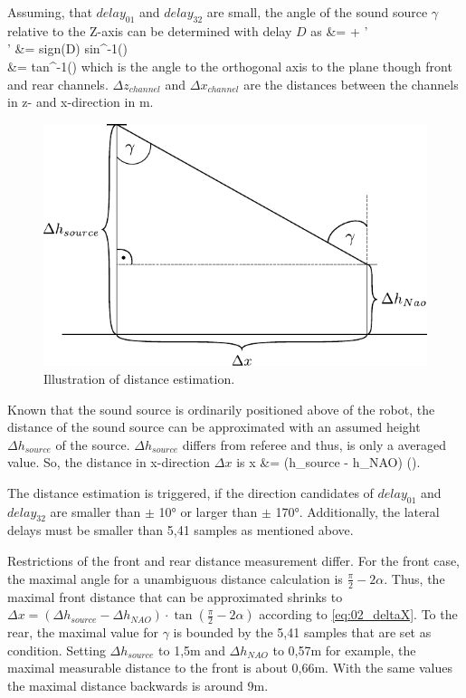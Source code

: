 Assuming, that $delay_{01}$ and $delay_{32}$ are small,
the angle of the sound source $\gamma$ relative
to the Z-axis can be determined with delay $D$ as
\bsub \bal
\gamma &= \alpha + \gamma'\\
\gamma' &= sign(D) \cdot sin^{-1}\left(\right)\\
\alpha &= tan^{-1}\left(\right)
\eal \esub
which is the angle to the orthogonal axis to the plane though
front and rear channels.
$\Delta z_{channel}$ and $\Delta x_{channel}$ are the distances between the channels
in z- and x-direction in \si{\meter}.
\begin{figure}[ht]
	\centering
		\includegraphics[width=0.6\columnwidth]{figures/x_distance}
	\caption{Illustration of distance estimation.}
    \label{fig:02_xDistance}
\end{figure}

Known that the sound source is ordinarily positioned above of the robot, the distance
of the sound source can be approximated with an assumed height $\Delta h_{source}$
of the source. $\Delta h_{source}$ differs from referee and thus, is only
a averaged value.
So, the distance in x-direction $\Delta x$ is
\bal
\Delta x &= (\Delta h_{source} - \Delta h_{NAO}) \cdot \tan(\gamma).
\label{eq:02_deltaX}
\eal

The distance estimation is triggered, if the direction candidates of
$delay_{01}$ and $delay_{32}$ are smaller than $\pm$ 10\si{\degree}
or larger than $\pm$ 170\si{\degree}.
Additionally, the lateral delays must be smaller than 5,41 samples as mentioned above.

Restrictions of the front and rear distance measurement differ.
For the front case, the maximal angle for a unambiguous distance calculation
is $\frac{\pi}{2}- 2\alpha$.
Thus, the maximal front distance that can be approximated shrinks to
$\Delta x = (\Delta h_{source} - \Delta h_{NAO}) \cdot \tan(\frac{\pi}{2} - 2\alpha)$
according to \cref{eq:02_deltaX}.
To the rear, the maximal value for $\gamma$ is bounded by the 5,41 samples that
are set as condition.
Setting $\Delta h_{source}$ to 1,5\si{m} and $\Delta h_{NAO}$ to 0,57\si{\meter} for example,
the maximal measurable distance to the front is about 0,66\si{\meter}.
With the same values the maximal distance backwards is around 9\si{\meter}.

